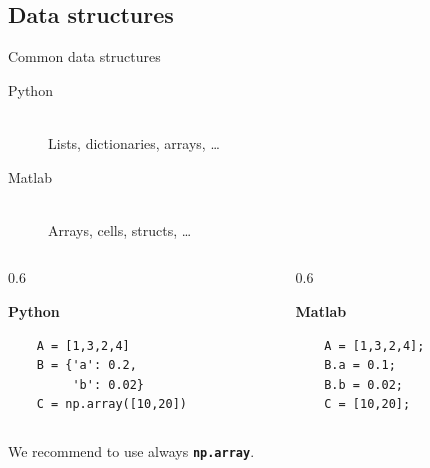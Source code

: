 \documentclass[xcolor=x11names, compress]{beamer}
\renewcommand{\(}{\begin{columns}}
\renewcommand{\)}{\end{columns}}
\newcommand{\<}[1]{\begin{column}{#1}}
\renewcommand{\>}{\end{column}}
\begin{document}
\subsection{Data structures}
\begin{frame}[fragile]{Common data structures}

  \large
  \vspace{-5pt}

  \begin{description}
    \item[Python] ~ \\ \hspace{-30pt} Lists, dictionaries, arrays, \ldots
    \vspace{8pt}
    \item[Matlab] ~ \\ \hspace{-30pt} Arrays, cells, structs, \ldots
  \end{description}

  \vspace{10pt}
  \pause

  \(
  \<{0.6\linewidth}

  \centering
  \textbf{Python}
  \begin{verbatim}
    A = [1,3,2,4]
    B = {'a': 0.2,
         'b': 0.02}
    C = np.array([10,20])
  \end{verbatim}

  \> \<{0.6\linewidth}

  \centering
  \textbf{Matlab}
  \begin{verbatim}
    A = [1,3,2,4];
    B.a = 0.1;
    B.b = 0.02;
    C = [10,20];
  \end{verbatim}

  \>
  \)

  \vspace{25pt}
  \pause

  We recommend to use always \textbf{\texttt{np.array}}.

\end{frame}

\end{document}
